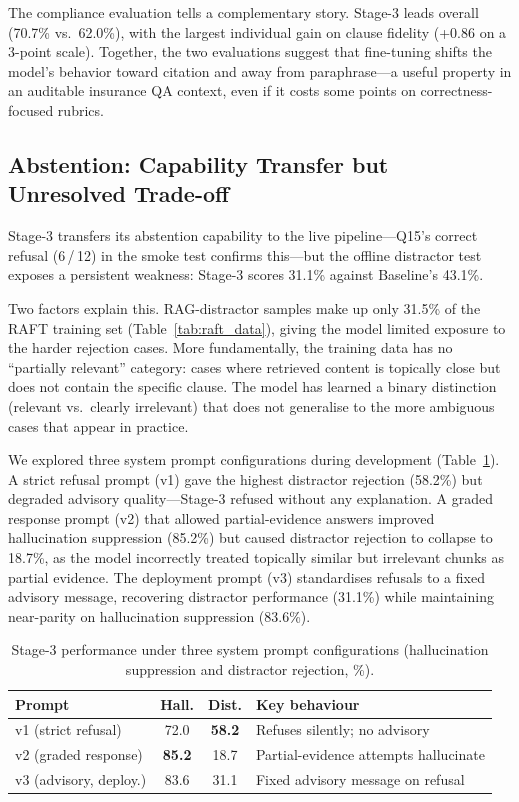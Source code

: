 \documentclass[10pt,conference]{IEEEtran}
\begin{document}
The compliance evaluation tells a complementary story.
Stage-3 leads overall (70.7\% vs.\ 62.0\%), with the largest individual gain
on clause fidelity (+0.86 on a 3-point scale).
Together, the two evaluations suggest that fine-tuning shifts the model's
behavior toward citation and away from paraphrase---a useful property in
an auditable insurance QA context, even if it costs some points on
correctness-focused rubrics.

\subsection{Abstention: Capability Transfer but Unresolved Trade-off}

Stage-3 transfers its abstention capability to the live pipeline---Q15's
correct refusal (6\,/\,12) in the smoke test confirms this---but the offline
distractor test exposes a persistent weakness: Stage-3 scores 31.1\% against
Baseline's 43.1\%.

Two factors explain this.
RAG-distractor samples make up only 31.5\% of the RAFT training set
(Table~\ref{tab:raft_data}), giving the model limited exposure to the harder
rejection cases.
More fundamentally, the training data has no ``partially relevant'' category:
cases where retrieved content is topically close but does not contain the
specific clause.
The model has learned a binary distinction (relevant vs.\ clearly irrelevant)
that does not generalise to the more ambiguous cases that appear in practice.

We explored three system prompt configurations during development
(Table~\ref{tab:prompt_ablation}).
A strict refusal prompt (v1) gave the highest distractor rejection (58.2\%)
but degraded advisory quality---Stage-3 refused without any explanation.
A graded response prompt (v2) that allowed partial-evidence answers improved
hallucination suppression (85.2\%) but caused distractor rejection to collapse
to 18.7\%, as the model incorrectly treated topically similar but irrelevant
chunks as partial evidence.
The deployment prompt (v3) standardises refusals to a fixed advisory message,
recovering distractor performance (31.1\%) while maintaining near-parity on
hallucination suppression (83.6\%).

\begin{table}[htbp]
\centering
\caption{Stage-3 performance under three system prompt configurations
(hallucination suppression and distractor rejection, \%).}
\label{tab:prompt_ablation}
\small
\begin{tabular}{@{}lccp{3.2cm}@{}}
\toprule
Prompt & Hall. & Dist. & Key behaviour \\
\midrule
v1 (strict refusal)     & 72.0 & \textbf{58.2} & Refuses silently; no advisory \\
v2 (graded response)    & \textbf{85.2} & 18.7 & Partial-evidence attempts hallucinate \\
v3 (advisory, deploy.)  & 83.6 & 31.1 & Fixed advisory message on refusal \\
\bottomrule
\end{tabular}
\end{table}
\end{document}
